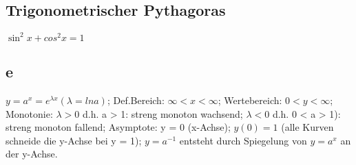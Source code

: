 \subsection{Trigonometrischer Pythagoras}
$ \sin^2 x + cos^2 x = 1 $
\subsection{e}
$ y = a^{x} = e^{\lambda x} (\lambda = ln a) $; 
Def.Bereich: $ \infty < x < \infty $; 
Wertebereich: $ 0 < y < \infty$; 
Monotonie: $ \lambda > 0 $ d.h. a > 1: streng monoton wachsend; $ \lambda < 0 $ d.h. 0 < a > 1): streng monoton fallend; 
Asymptote: y = 0 (x-Achse); 
$ y(0) = 1 $ (alle Kurven schneide die y-Achse bei y = 1); 
$ y = a^{-1} $ entsteht durch Spiegelung von $ y = a^{x} $ an der y-Achse.